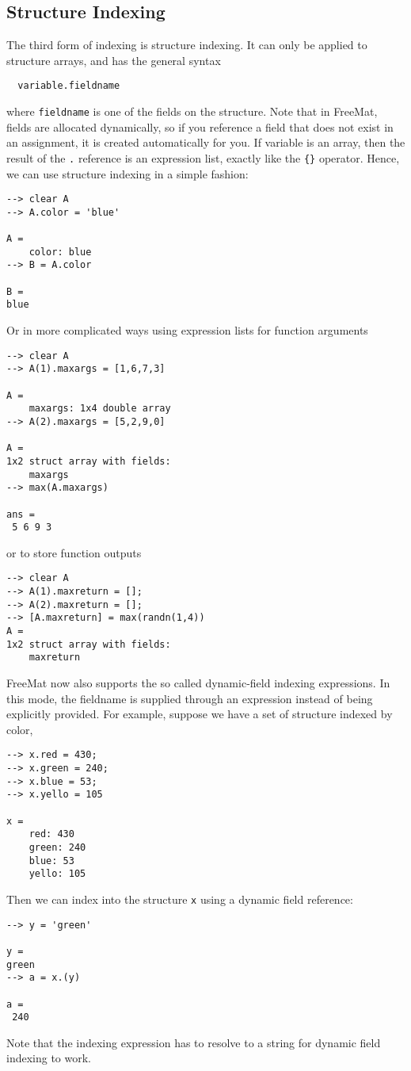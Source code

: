 \subsection{Structure Indexing}

The third form of indexing is structure indexing.  It can only
be applied to structure arrays, and has the general syntax
\begin{verbatim}
  variable.fieldname
\end{verbatim}
where \verb|fieldname| is one of the fields on the structure.  Note that
in FreeMat, fields are allocated dynamically, so if you reference
a field that does not exist in an assignment, it is created automatically
for you.  If variable is an array, then the result of the \verb|.|
reference is an expression list, exactly like the \verb|{}| operator.  Hence,
we can use structure indexing in a simple fashion:
\begin{verbatim}
--> clear A
--> A.color = 'blue'

A = 
    color: blue
--> B = A.color

B = 
blue
\end{verbatim}
Or in more complicated ways using expression lists for function arguments
\begin{verbatim}
--> clear A
--> A(1).maxargs = [1,6,7,3]

A = 
    maxargs: 1x4 double array
--> A(2).maxargs = [5,2,9,0]

A = 
1x2 struct array with fields:
    maxargs
--> max(A.maxargs)

ans = 
 5 6 9 3 
\end{verbatim}
or to store function outputs
\begin{verbatim}
--> clear A
--> A(1).maxreturn = [];
--> A(2).maxreturn = [];
--> [A.maxreturn] = max(randn(1,4))
A = 
1x2 struct array with fields:
    maxreturn
\end{verbatim}
FreeMat now also supports the so called dynamic-field indexing
expressions.  In this mode, the fieldname is supplied through
an expression instead of being explicitly provided.  For example,
suppose we have a set of structure indexed by color,
\begin{verbatim}
--> x.red = 430;
--> x.green = 240;
--> x.blue = 53;
--> x.yello = 105

x = 
    red: 430
    green: 240
    blue: 53
    yello: 105
\end{verbatim}
Then we can index into the structure \verb|x| using a dynamic field
reference:
\begin{verbatim}
--> y = 'green'

y = 
green
--> a = x.(y)

a = 
 240 
\end{verbatim}
Note that the indexing expression has to resolve to a string for
dynamic field indexing to work.

